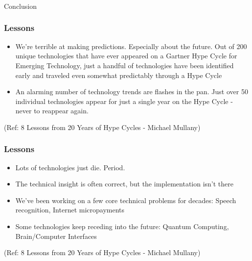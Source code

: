 \begin{frame}[fragile]\frametitle{}
\begin{center}
{\Large Conclusion}
\end{center}
\end{frame}

\begin{frame}[fragile]\frametitle{Lessons}


\begin{itemize}
\item  We're terrible at making predictions. Especially about the future. Out of 200 unique technologies that have ever appeared on a Gartner Hype Cycle for Emerging Technology, just a handful of technologies  have been identified early and traveled even somewhat predictably through a Hype Cycle
\item An alarming number of technology trends are flashes in the pan. Just over 50 individual technologies appear for just a single year on the Hype Cycle - never to reappear again. 
\end{itemize}


{\tiny (Ref: 8 Lessons from 20 Years of Hype Cycles - Michael Mullany)}

\end{frame}

\begin{frame}[fragile]\frametitle{Lessons}


\begin{itemize}
\item  Lots of technologies just die. Period. 
\item The technical insight is often correct, but the implementation isn't there
\item We've been working on a few core technical problems for decades: Speech recognition, Internet micropayments
\item Some technologies keep receding into the future: Quantum Computing, Brain/Computer Interfaces
\end{itemize}


{\tiny (Ref: 8 Lessons from 20 Years of Hype Cycles - Michael Mullany)}

\end{frame}

